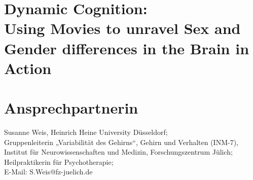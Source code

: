 \documentclass[11pt,a4paper]{article}
\begin{document}
\noindent
\section*{\Large\textbf{Dynamic Cognition: \\Using Movies to unravel Sex and Gender differences in the Brain in Action}}
\hfill

\section*{Ansprechpartnerin}
Susanne Weis, Heinrich Heine University Düsseldorf; \\
Gruppenleiterin „Variabilität des Gehirns“, Gehirn und Verhalten (INM-7), Institut für Neurowissenschaften und Medizin,  
Forschungszentrum Jülich; \\
Heilpraktikerin für Psychotherapie; \\
E-Mail: S.Weis@fz-juelich.de
\end{document}
